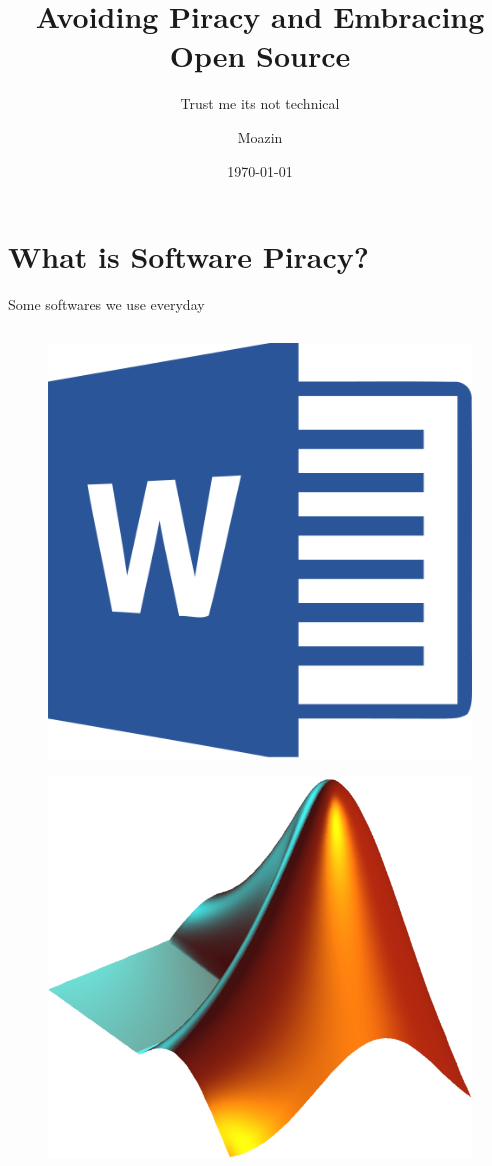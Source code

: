 \documentclass[10pt]{beamer}
\title{Avoiding Piracy and Embracing Open Source}
\subtitle{Trust me its not technical}
\date{\today}
\author{Moazin}
\institute{Pakistan Institute of Engineering \& Applied Sciences}
\begin{document}
\maketitle
    \section{What is Software Piracy?}
    \begin{frame}{Some softwares we use everyday}
        \begin{columns}
            \begin{column}{0.33\textwidth}
                \begin{figure}
                    \centering
                    \includegraphics[width=1\textwidth]{images/word}
                \end{figure}
                \begin{figure}
                    \centering
                    \includegraphics[width=1\textwidth]{images/matlab}

\end{figure}
\end{column}
\end{columns}
\end{frame}
\end{document}
